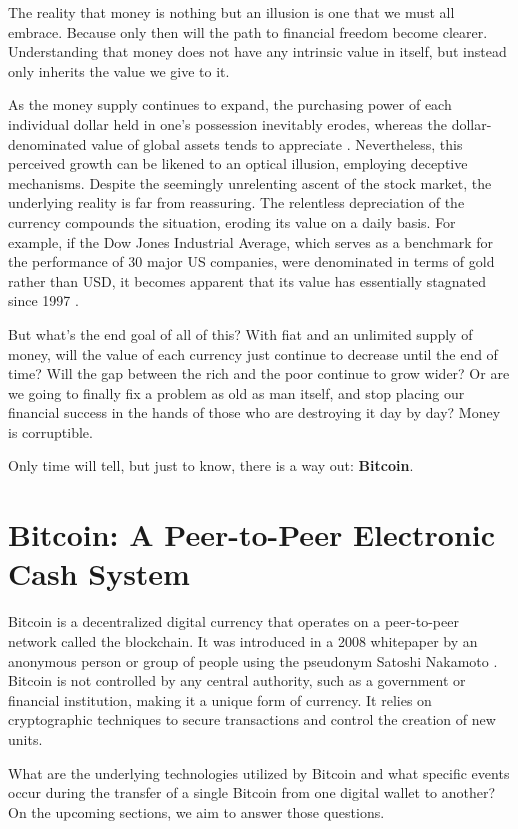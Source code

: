 The reality that money is nothing but an illusion is one that we must all embrace. Because only then will the path to financial freedom become
clearer. Understanding that money does not have any intrinsic value in itself, but instead only inherits the value we give to it.

As the money supply continues to expand, the purchasing power of each individual dollar held in one's possession inevitably erodes, whereas the dollar-denominated value of global assets tends to appreciate \cite{moneyprinting}. Nevertheless, this perceived growth can be likened to an optical illusion, employing deceptive mechanisms. Despite the seemingly unrelenting ascent of the stock market, the underlying reality is far from reassuring. The relentless depreciation of the currency compounds the situation, eroding its value on a daily basis. For example, if the Dow Jones Industrial Average, which serves as a benchmark for the performance of 30 major US companies, were denominated in terms of gold rather than USD, it becomes apparent that its value has essentially stagnated since 1997 \cite{stockmarketillusion}.

But what's the end goal of all of this? With fiat and an unlimited supply of money, will the value of each currency just continue to decrease until
the end of time? Will the gap between the rich and the poor continue to grow wider? Or are we going to finally fix a problem as old as man itself, and
stop placing our financial success in the hands of those who are destroying it day by day? Money is corruptible.

Only time will tell, but just to know, there is a way out: \textbf{Bitcoin}.

\section{Bitcoin: A Peer-to-Peer Electronic Cash System}
Bitcoin is a decentralized digital currency that operates on a peer-to-peer network called the blockchain. It was introduced in a 2008 whitepaper by an anonymous person or group of people using the pseudonym Satoshi Nakamoto \cite{nakamoto2008bitcoin}. Bitcoin is not controlled by any central authority, such as a government or financial institution, making it a unique form of currency. It relies on cryptographic techniques to secure transactions and control the creation of new units.

What are the underlying technologies utilized by Bitcoin and what specific events occur during the transfer of a single Bitcoin from one digital wallet to another? On the upcoming sections, we aim to answer those questions.

